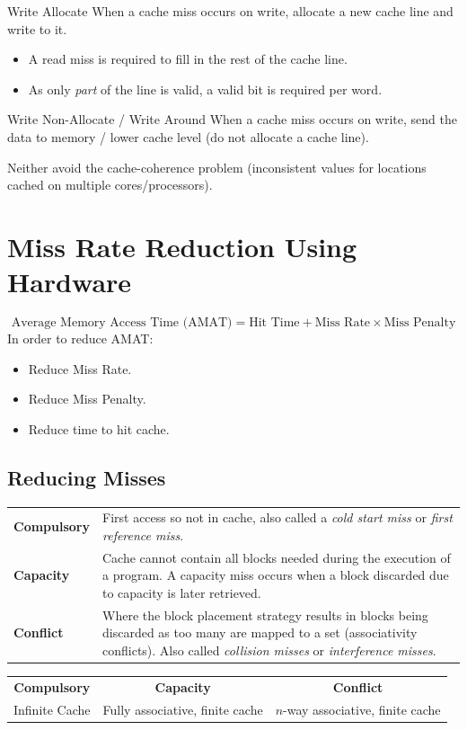 \begin{definitionbox}{Write Allocate}
    When a cache miss occurs on write, allocate a new cache line and write to it.
    \begin{itemize}
        \item A read miss is required to fill in the rest of the cache line.
        \item As only \textit{part} of the line is valid, a valid bit is required per word.
    \end{itemize}
\end{definitionbox}
\begin{definitionbox}{Write Non-Allocate / Write Around}
    When a cache miss occurs on write, send the data to memory / lower cache level (do not allocate a cache line).

\end{definitionbox}
Neither avoid the cache-coherence problem (inconsistent values for locations cached on multiple cores/processors).

\section{Miss Rate Reduction Using Hardware}
\[\text{Average Memory Access Time (AMAT)} = \text{Hit Time} + \text{Miss Rate} \times \text{Miss Penalty}\]
In order to reduce AMAT:
\begin{itemize}
    \item Reduce Miss Rate.
    \item Reduce Miss Penalty.
    \item Reduce time to hit cache.
\end{itemize}

\subsection{Reducing Misses}
\begin{center}
    \begin{tabular}{l p{}}
        \textbf{Compulsory} & First access so not in cache, also called a \textit{cold start miss} or \textit{first reference miss}. \\
        \textbf{Capacity} & Cache cannot contain all blocks needed during the execution of a program. A capacity miss occurs when a block discarded due to capacity is later retrieved. \\
        \textbf{Conflict} & Where the block placement strategy results in blocks being discarded as too many are mapped to a set (associativity conflicts). Also called \textit{collision misses} or \textit{interference misses}. \\
    \end{tabular}
\end{center}
\begin{center}
    \begin{tabular}{c c c}
        \textbf{Compulsory} & \textbf{Capacity} & \textbf{Conflict} \\
        Infinite Cache & Fully associative, finite cache & $n$-way associative, finite cache \\
    \end{tabular}
\end{center}


